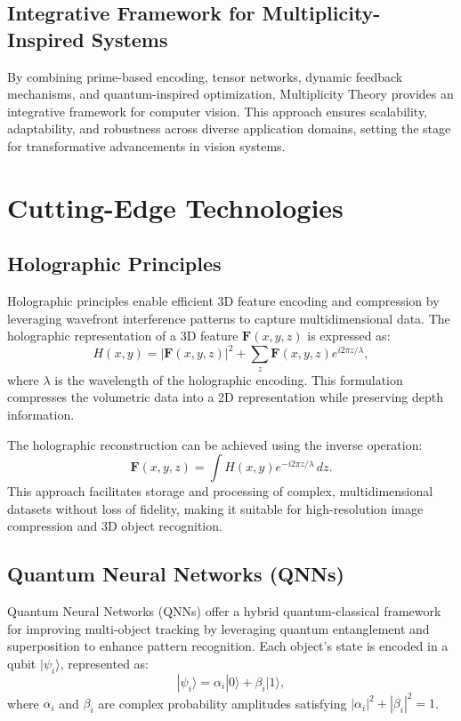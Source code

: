 \documentclass{article}
\theoremstyle{plain}
\begin{document}
\subsection{Integrative Framework for Multiplicity-Inspired Systems}
By combining prime-based encoding, tensor networks, dynamic feedback mechanisms, and quantum-inspired optimization, Multiplicity Theory provides an integrative framework for computer vision. This approach ensures scalability, adaptability, and robustness across diverse application domains, setting the stage for transformative advancements in vision systems.

\section{Cutting-Edge Technologies}

\subsection{Holographic Principles}
Holographic principles enable efficient 3D feature encoding and compression by leveraging wavefront interference patterns to capture multidimensional data. The holographic representation of a 3D feature \( \mathbf{F}(x, y, z) \) is expressed as:
\begin{equation}
H(x, y) = |\mathbf{F}(x, y, z)|^2 + \sum_{z} \mathbf{F}(x, y, z) e^{i 2 \pi z / \lambda},
\end{equation}
where \( \lambda \) is the wavelength of the holographic encoding. This formulation compresses the volumetric data into a 2D representation while preserving depth information. 

The holographic reconstruction can be achieved using the inverse operation:
\begin{equation}
\mathbf{F}(x, y, z) = \int H(x, y) e^{-i 2 \pi z / \lambda} \, dz.
\end{equation}
This approach facilitates storage and processing of complex, multidimensional datasets without loss of fidelity, making it suitable for high-resolution image compression and 3D object recognition.

\subsection{Quantum Neural Networks (QNNs)}
Quantum Neural Networks (QNNs) offer a hybrid quantum-classical framework for improving multi-object tracking by leveraging quantum entanglement and superposition to enhance pattern recognition. Each object’s state is encoded in a qubit \( |\psi_i\rangle \), represented as:
\begin{equation}
|\psi_i\rangle = \alpha_i |0\rangle + \beta_i |1\rangle,
\end{equation}
where \( \alpha_i \) and \( \beta_i \) are complex probability amplitudes satisfying \( |\alpha_i|^2 + |\beta_i|^2 = 1 \).
\end{document}
